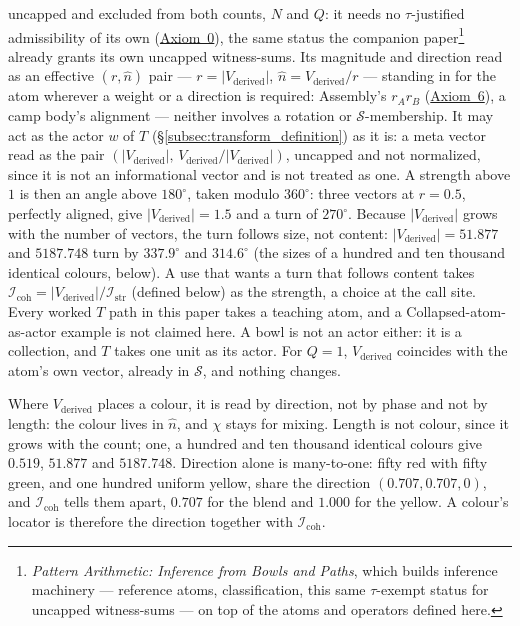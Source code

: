 \documentclass[12pt, a4paper]{article}
\begin{document}
uncapped and excluded from both counts, $N$ and $Q$: it needs no $\tau$-justified
admissibility of its own (\hyperref[subsec:axiom0_admissibility]{Axiom~0}),
the same status the companion paper\footnote{\emph{Pattern
Arithmetic: Inference from Bowls and Paths}, which builds inference
machinery --- reference atoms, classification, this same
$\tau$-exempt status for uncapped witness-sums --- on top of the
atoms and operators defined here.} already grants its own uncapped
witness-sums. Its magnitude and direction read as an effective
$(r,\hat n)$ pair --- $r=\lvert V_{\text{derived}}\rvert$, $\hat n =
V_{\text{derived}}/r$ --- standing in for the atom wherever a weight
or a direction is required: Assembly's $r_Ar_B$
(\hyperref[subsec:axiom_assembly]{Axiom~6}), a camp body's alignment ---
neither involves a rotation or $\mathcal{S}$-membership. It may act
as the actor $w$ of $T$ (\S\ref{subsec:transform_definition}) as it is: a
meta vector read as the pair $(\lvert V_{\text{derived}}\rvert,\,
V_{\text{derived}}/\lvert V_{\text{derived}}\rvert)$, uncapped and not
normalized, since it is not an informational vector and is not treated as
one. A strength above $1$ is then an angle above $180^\circ$, taken modulo
$360^\circ$: three vectors at $r=0.5$, perfectly aligned, give $\lvert
V_{\text{derived}}\rvert=1.5$ and a turn of $270^\circ$. Because $\lvert
V_{\text{derived}}\rvert$ grows with the number of vectors, the turn follows
size, not content: $\lvert V_{\text{derived}}\rvert=51.877$ and $5187.748$
turn by $337.9^\circ$ and $314.6^\circ$ (the sizes of a hundred and ten thousand identical colours, below). A use that wants a turn that
follows content takes $\mathcal{I}_{\mathrm{coh}}=\lvert V_{\text{derived}}\rvert/\mathcal{I}_{\mathrm{str}}$ (defined below) as the strength, a
choice at the call site. Every worked $T$ path in this paper takes a
teaching atom, and a Collapsed-atom-as-actor example is not claimed here. A bowl is not an actor either: it is a collection, and $T$ takes one unit as its actor. For $Q=1$,
$V_{\text{derived}}$ coincides with the atom's own vector, already
in $\mathcal{S}$, and nothing changes.

Where $V_{\text{derived}}$ places a colour, it is read by direction, not by
phase and not by length: the colour lives in $\hat n$, and $\chi$ stays for
mixing. Length is not colour, since it grows with the count; one, a hundred
and ten thousand identical colours give $0.519$, $51.877$ and $5187.748$.
Direction alone is many-to-one: fifty red with fifty green, and one hundred
uniform yellow, share the direction $(0.707,0.707,0)$, and $\mathcal{I}_{\mathrm{coh}}$
tells them apart, $0.707$ for the blend and $1.000$ for the yellow. A
colour's locator is therefore the direction together with $\mathcal{I}_{\mathrm{coh}}$.
\end{document}
